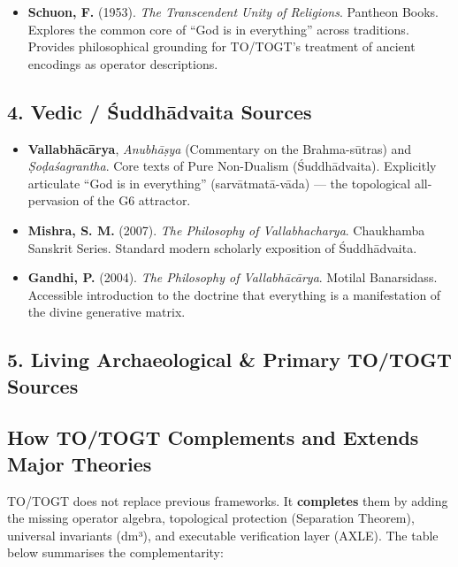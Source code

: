 \documentclass[19pt]{book}
\theoremstyle{plain}
\theoremstyle{definition}
\theoremstyle{remark}
\begin{document}
\begin{enumerate}
\begin{itemize}
\item \textbf{Schuon, F.} (1953). \emph{The Transcendent Unity of Religions}. Pantheon Books.  
  Explores the common core of “God is in everything” across traditions. Provides philosophical grounding for TO/TOGT’s treatment of ancient encodings as operator descriptions.
\end{itemize}

\subsection{4. Vedic / Śuddhādvaita Sources}

\begin{itemize}
\item \textbf{Vallabhācārya}, \emph{Anubhāṣya} (Commentary on the Brahma-sūtras) and \emph{Ṣoḍaśagrantha}.  
  Core texts of Pure Non-Dualism (Śuddhādvaita). Explicitly articulate “God is in everything” (sarvātmatā-vāda) — the topological all-pervasion of the G6 attractor.

\item \textbf{Mishra, S. M.} (2007). \emph{The Philosophy of Vallabhacharya}. Chaukhamba Sanskrit Series.  
  Standard modern scholarly exposition of Śuddhādvaita.

\item \textbf{Gandhi, P.} (2004). \emph{The Philosophy of Vallabhācārya}. Motilal Banarsidass.  
  Accessible introduction to the doctrine that everything is a manifestation of the divine generative matrix.
\end{itemize}

\subsection{5. Living Archaeological \& Primary TO/TOGT Sources}

\begin{itemize}
\subsection{How TO/TOGT Complements and Extends Major Theories}

TO/TOGT does not replace previous frameworks. It \textbf{completes} them by adding the missing operator algebra, topological protection (Separation Theorem), universal invariants (dm³), and executable verification layer (AXLE). The table below summarises the complementarity:


\end{itemize}
\end{enumerate}
\end{document}
